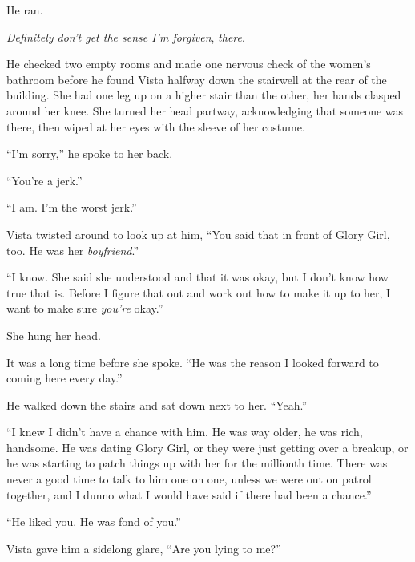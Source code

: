 He ran.



\emph{Definitely don't get the sense I'm forgiven}, \emph{there}.



He checked two empty rooms and made one nervous check of the women's bathroom before he found Vista halfway down the stairwell at the rear of the building.  She had one leg up on a higher stair than the other, her hands clasped around her knee.  She turned her head partway, acknowledging that someone was there, then wiped at her eyes with the sleeve of her costume.



``I'm sorry,'' he spoke to her back.



``You're a jerk.''



``I am.  I'm the worst jerk.''



Vista twisted around to look up at him, ``You said that in front of Glory Girl, too.  He was her \emph{boyfriend}.''



``I know.  She said she understood and that it was okay, but I don't know how true that is.  Before I figure that out and work out how to make it up to her, I want to make sure \emph{you're} okay.''



She hung her head.



It was a long time before she spoke.  ``He was the reason I looked forward to coming here every day.''



He walked down the stairs and sat down next to her.  ``Yeah.''



``I knew I didn't have a chance with him.  He was way older, he was rich, handsome.  He was dating Glory Girl, or they were just getting over a breakup, or he was starting to patch things up with her for the millionth time.  There was never a good time to talk to him one on one, unless we were out on patrol together, and I dunno what I would have said if there had been a chance.''



``He liked you.  He was fond of you.''



Vista gave him a sidelong glare, ``Are you lying to me?''



